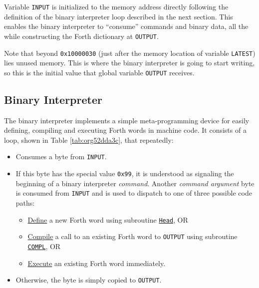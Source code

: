 \documentclass[a4paper,12pt,final]{article}
\begin{document}
Variable \texttt{INPUT} is initialized to the memory address directly
following the definition of the binary interpreter loop described in
the next section.  This enables the binary interpreter to ``consume''
commands and binary data, all the while constructing the Forth
dictionary at \texttt{OUTPUT}.

Note that beyond \texttt{0x10000030} (just after the memory location of
variable \texttt{LATEST}) lies unused memory. This is where the binary
interpreter is going to start writing, so this is the initial value
that global variable \texttt{OUTPUT} receives.
\clearpage


\subsection{Binary Interpreter}
\label{sec:org1a2f8d5}

The binary interpreter implements a simple meta-programming device for
easily defining, compiling and executing Forth words in machine code.
It consists of a loop, shown in Table \ref{tab:org52dda3c}, that repeatedly:
\begin{itemize}
\item Consumes a byte from \texttt{INPUT}.
\item If this byte has the special value \texttt{0x99}, it is understood as
signaling the beginning of a binary interpreter \emph{command}.  Another
\emph{command argument} byte is consumed from \texttt{INPUT} and is used to
dispatch to one of three possible code paths:
\begin{itemize}
\item \uline{Define} a new Forth word using subroutine \hyperref[tab:org001d2e8]{\texttt{Head}}, OR
\item \uline{Compile} a call to an existing Forth word to \texttt{OUTPUT} using
subroutine \hyperref[tab:org55cc663]{\texttt{COMPL}}, OR
\item \uline{Execute} an existing Forth word immediately.
\end{itemize}
\item Otherwise, the byte is simply copied to \texttt{OUTPUT}.
\end{itemize}
\end{document}

